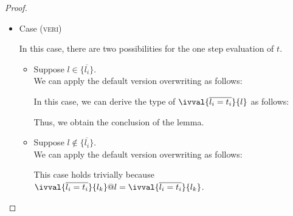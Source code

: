 \begin{proof}
\begin{itemize}
\item Case (\textsc{veri})
\begin{center}
    \begin{minipage}{.55\linewidth}
    \end{minipage}
\end{center}
In this case, there are two possibilities for the one step evaluation of $t$.
\begin{itemize}
\item Suppose $l \in \{\overline{l_i}\}$.\\
We can apply the default version overwriting as follows:
\begin{center}
    \begin{minipage}{.40\linewidth}
    \end{minipage}
\end{center}
In this case, we can derive the type of $\ivval{\overline{l_i=t_i}}{l}$ as follows:
\begin{center}
    \begin{minipage}{.65\linewidth}
    \end{minipage}
\end{center}
Thus, we obtain the conclusion of the lemma.
\item Suppose $l \notin \{\overline{l_i}\}$.\\
We can apply the default version overwriting as follows:
\begin{center}
    \begin{minipage}{.50\linewidth}
    \end{minipage}
\end{center}
This case holds trivially because $\ivval{\overline{l_i=t_i}}{l_k}@l = \ivval{\overline{l_i=t_i}}{l_k}$.\\
\end{itemize}


\end{itemize}
\end{proof}
